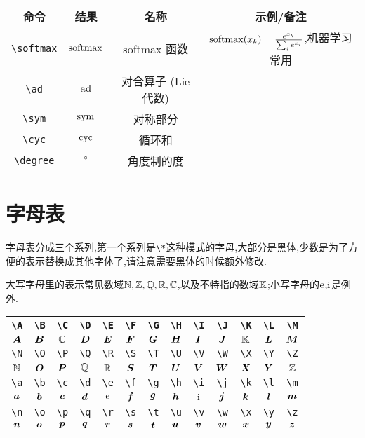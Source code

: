 \documentclass[lang=cn,12pt,scheme=chinese,mode=simple,black]{elegantbook}
\begin{document}
\begin{center}
\setlength{\tabcolsep}{10pt}
\begin{tabular}{|c|c|c|c|}
\hline
\textbf{命令} & \textbf{结果} & \textbf{名称} & \textbf{示例/备注}\\
\verb|\softmax| & $\softmax$ & softmax 函数 & $\softmax(x_k)=\frac{e^{x_k}}{\sum_i e^{x_i}}$,机器学习常用\\
\verb|\ad| & $\ad$ & 对合算子 (Lie 代数) & \\
\verb|\sym| & $\sym$ & 对称部分 & \\
\verb|\cyc| & $\cyc$ & 循环和 & \\
\verb|\degree| & $\degree$ & 角度制的度 & \\
\hline
\end{tabular}
\end{center}


\newpage
\section*{字母表}
字母表分成三个系列,第一个系列是\verb|\*|这种模式的字母,大部分是黑体,少数是为了方便的表示替换成其他字体了,请注意需要黑体的时候额外修改.

大写字母里的表示常见数域$\N,\Z,\Q,\R,\C$,以及不特指的数域$\K$;小写字母的$\e$,$\i$是例外.
\begin{center}
\renewcommand{\arraystretch}{1.4}
\begin{tabular}{|c|c|c|c|c|c|c|c|c|c|c|c|c|}
\hline\hline
\verb|\A| & \verb|\B| & \verb|\C| & \verb|\D| & \verb|\E| & \verb|\F| & \verb|\G| & \verb|\H| & \verb|\I| & \verb|\J| & \verb|\K| & \verb|\L| & \verb|\M|\\
\hline
$\A$ & $\B$ & $\C$ & $\D$ & $\E$ & $\F$ & $\G$ & $\H$ & $\I$ & $\J$ & $\K$ & $\L$ & $\M$\\
\hline\hline
\verb|\N| & \verb|\O| & \verb|\P| & \verb|\Q| & \verb|\R| & \verb|\S| & \verb|\T| & \verb|\U| & \verb|\V| & \verb|\W| & \verb|\X| & \verb|\Y| & \verb|\Z|\\
\hline
$\N$ & $\O$ & $\P$ & $\Q$ & $\R$ & $\S$ & $\T$ & $\U$ & $\V$ & $\W$ & $\X$ & $\Y$ & $\Z$\\
\hline\hline
\verb|\a| & \verb|\b| & \verb|\c| & \verb|\d| & \verb|\e| & \verb|\f| & \verb|\g| & \verb|\h| & \verb|\i| & \verb|\j| & \verb|\k| & \verb|\l| & \verb|\m|\\
\hline
$\a$ & $\b$ & $\c$ & $\d$ & $\e$ & $\f$ & $\g$ & $\h$ & $\i$ & $\j$ & $\k$ & $\l$ & $\m$\\
\hline\hline
\verb|\n| & \verb|\o| & \verb|\p| & \verb|\q| & \verb|\r| & \verb|\s| & \verb|\t| & \verb|\u| & \verb|\v| & \verb|\w| & \verb|\x| & \verb|\y| & \verb|\z|\\
\hline
$\n$ & $\o$ & $\p$ & $\q$ & $\r$ & $\s$ & $\t$ & $\u$ & $\v$ & $\w$ & $\x$ & $\y$ & $\z$\\
\hline\hline
\end{tabular}
\end{center}
\end{document}
